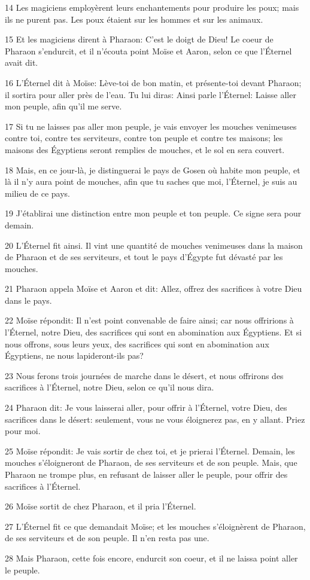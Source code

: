 \par 14 Les magiciens employèrent leurs enchantements pour produire les poux; mais ils ne purent pas. Les poux étaient sur les hommes et sur les animaux.
\par 15 Et les magiciens dirent à Pharaon: C'est le doigt de Dieu! Le coeur de Pharaon s'endurcit, et il n'écouta point Moïse et Aaron, selon ce que l'Éternel avait dit.
\par 16 L'Éternel dit à Moïse: Lève-toi de bon matin, et présente-toi devant Pharaon; il sortira pour aller près de l'eau. Tu lui diras: Ainsi parle l'Éternel: Laisse aller mon peuple, afin qu'il me serve.
\par 17 Si tu ne laisses pas aller mon peuple, je vais envoyer les mouches venimeuses contre toi, contre tes serviteurs, contre ton peuple et contre tes maisons; les maisons des Égyptiens seront remplies de mouches, et le sol en sera couvert.
\par 18 Mais, en ce jour-là, je distinguerai le pays de Gosen où habite mon peuple, et là il n'y aura point de mouches, afin que tu saches que moi, l'Éternel, je suis au milieu de ce pays.
\par 19 J'établirai une distinction entre mon peuple et ton peuple. Ce signe sera pour demain.
\par 20 L'Éternel fit ainsi. Il vint une quantité de mouches venimeuses dans la maison de Pharaon et de ses serviteurs, et tout le pays d'Égypte fut dévasté par les mouches.
\par 21 Pharaon appela Moïse et Aaron et dit: Allez, offrez des sacrifices à votre Dieu dans le pays.
\par 22 Moïse répondit: Il n'est point convenable de faire ainsi; car nous offririons à l'Éternel, notre Dieu, des sacrifices qui sont en abomination aux Égyptiens. Et si nous offrons, sous leurs yeux, des sacrifices qui sont en abomination aux Égyptiens, ne nous lapideront-ils pas?
\par 23 Nous ferons trois journées de marche dans le désert, et nous offrirons des sacrifices à l'Éternel, notre Dieu, selon ce qu'il nous dira.
\par 24 Pharaon dit: Je vous laisserai aller, pour offrir à l'Éternel, votre Dieu, des sacrifices dans le désert: seulement, vous ne vous éloignerez pas, en y allant. Priez pour moi.
\par 25 Moïse répondit: Je vais sortir de chez toi, et je prierai l'Éternel. Demain, les mouches s'éloigneront de Pharaon, de ses serviteurs et de son peuple. Mais, que Pharaon ne trompe plus, en refusant de laisser aller le peuple, pour offrir des sacrifices à l'Éternel.
\par 26 Moïse sortit de chez Pharaon, et il pria l'Éternel.
\par 27 L'Éternel fit ce que demandait Moïse; et les mouches s'éloignèrent de Pharaon, de ses serviteurs et de son peuple. Il n'en resta pas une.
\par 28 Mais Pharaon, cette fois encore, endurcit son coeur, et il ne laissa point aller le peuple.

